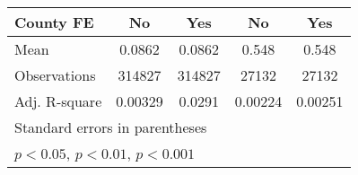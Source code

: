\begin{table}[htbp]
{\begin{tabular}{l*{4}{c}}
            County FE              & No                                   & Yes                                  & No                      & Yes                     \\
            \midrule
            Mean                   & 0.0862                               & 0.0862                               & 0.548                   & 0.548                   \\
            Observations           & 314827                               & 314827                               & 27132                   & 27132                   \\
            Adj. R-square          & 0.00329                              & 0.0291                               & 0.00224                 & 0.00251                 \\
            \bottomrule

            \multicolumn{5}{l}{\footnotesize Standard errors in parentheses}                                                                                         \\
            \multicolumn{5}{l}{\footnotesize \sym{*} \(p<0.05\), \sym{**} \(p<0.01\), \sym{***} \(p<0.001\)}                                                         \\
        \end{tabular}}
\end{table}